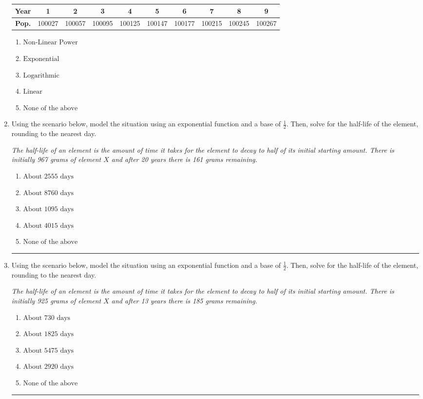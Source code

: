 \documentclass[14pt]{extbook}
\newcommand{\litem}[1]{\item#1\hspace*{-1cm}\rule{\textwidth}{0.4pt}}
\begin{document}
\begin{enumerate}
{\begin{tabular}{c|c|c|c|c|c|c|c|c|c}
\textbf{Year} & 1 & 2 & 3 & 4 & 5 & 6 & 7 & 8 & 9 \tabularnewline
\hline
\textbf{Pop.} & 100027 & 100057 & 100095 & 100125 & 100147 & 100177 & 100215 & 100245 & 100267
\end{tabular} \begin{enumerate}[label=\Alph*.]
\item \( \text{Non-Linear Power} \)
\item \( \text{Exponential} \)
\item \( \text{Logarithmic} \)
\item \( \text{Linear} \)
\item \( \text{None of the above} \)

\end{enumerate} }
\litem{
Using the scenario below, model the situation using an exponential function and a base of $\frac{1}{2}$. Then, solve for the half-life of the element, rounding to the nearest day.
\begin{center}
    \textit{ The half-life of an element is the amount of time it takes for the element to decay to half of its initial starting amount. There is initially 967 grams of element $X$ and after 20 years there is 161 grams remaining. }
\end{center}
\begin{enumerate}[label=\Alph*.]
\item \( \text{About } 2555 \text{ days} \)
\item \( \text{About } 8760 \text{ days} \)
\item \( \text{About } 1095 \text{ days} \)
\item \( \text{About } 4015 \text{ days} \)
\item \( \text{None of the above} \)

\end{enumerate} }
\litem{
Using the scenario below, model the situation using an exponential function and a base of $\frac{1}{2}$. Then, solve for the half-life of the element, rounding to the nearest day.
\begin{center}
    \textit{ The half-life of an element is the amount of time it takes for the element to decay to half of its initial starting amount. There is initially 925 grams of element $X$ and after 13 years there is 185 grams remaining. }
\end{center}
\begin{enumerate}[label=\Alph*.]
\item \( \text{About } 730 \text{ days} \)
\item \( \text{About } 1825 \text{ days} \)
\item \( \text{About } 5475 \text{ days} \)
\item \( \text{About } 2920 \text{ days} \)
\item \( \text{None of the above} \)


\end{enumerate}}
\end{enumerate}
\end{document}
